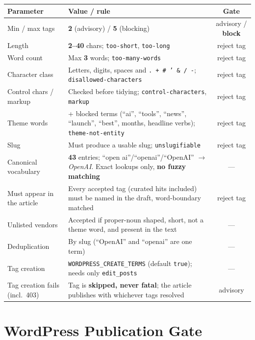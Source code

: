\documentclass[10pt,a4paper]{article}
\newcommand{\vr}[1]{\texttt{\footnotesize\hyphenpenalty=0\exhyphenpenalty=0\relax #1}}
\newcommand{\cd}[1]{\texttt{\footnotesize\hyphenpenalty=0\exhyphenpenalty=0\relax #1}}
\newcommand{\us}{\_\discretionary{}{}{}}
\newcommand{\BL}{\textcolor{st}{\textbf{block}}}
\newcommand{\AD}{\textcolor{hd}{advisory}}
\begin{document}
\begin{center}\footnotesize
\begin{tabularx}{\textwidth}{@{}>{\RaggedRight}p{4.6cm} >{\RaggedRight}X c@{}}
\toprule
\textbf{Parameter} & \textbf{Value / rule} & \textbf{Gate} \\
\midrule
Min / max tags & \textbf{2} (advisory) / \textbf{5} (blocking) & \AD{} / \BL \\
Length & \textbf{2--40} chars; \cd{too-short}, \cd{too-long} & reject tag \\
Word count & Max \textbf{3} words; \cd{too-many-words} & reject tag \\
Character class & Letters, digits, spaces and \cd{. + \# ' \& / -}; \cd{disallowed-characters} & reject tag \\
Control chars / markup & Checked before tidying; \cd{control-characters}, \cd{markup} & reject tag \\
Theme words & 60+ blocked terms (``ai'', ``tools'', ``news'', ``launch'', ``best'', months, headline verbs); \cd{theme-not-entity} & reject tag \\
Slug & Must produce a usable slug; \cd{unslugifiable} & reject tag \\
Canonical vocabulary & \textbf{43} entries; ``open ai''/``openai''/``OpenAI'' $\rightarrow$ \emph{OpenAI}. Exact lookups only, \textbf{no fuzzy matching} & --- \\
Must appear in the article & Every accepted tag (curated hits included) must be named in the draft, word-boundary matched & reject tag \\
Unlisted vendors & Accepted if proper-noun shaped, short, not a theme word, and present in the text & --- \\
Deduplication & By slug (``OpenAI'' and ``openai'' are one term) & --- \\
Tag creation & \vr{WORDPRESS\us CREATE\us TERMS} (default \cd{true}); needs only \cd{edit\us posts} & --- \\
Tag creation fails (incl.\ 403) & Tag is \textbf{skipped, never fatal}; the article publishes with whichever tags resolved & \AD \\
\bottomrule
\end{tabularx}
\end{center}

\section{WordPress Publication Gate}
\end{document}
